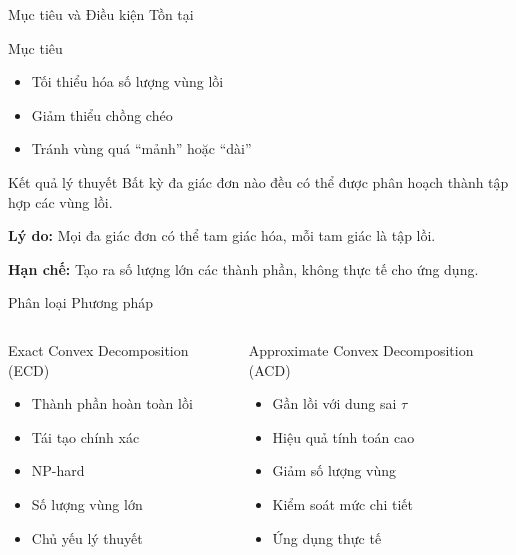 \documentclass[aspectratio=169]{beamer}
\begin{document}
\begin{frame}{Mục tiêu và Điều kiện Tồn tại}

    \begin{alertblock}{Mục tiêu}
        \begin{itemize}
            \item Tối thiểu hóa số lượng vùng lồi
            \item Giảm thiểu chồng chéo
            \item Tránh vùng quá ``mảnh'' hoặc ``dài''
        \end{itemize}
    \end{alertblock}

    \begin{exampleblock}{Kết quả lý thuyết}
        Bất kỳ đa giác đơn nào đều có thể được phân hoạch thành tập hợp các vùng lồi.

        \textbf{Lý do:} Mọi đa giác đơn có thể tam giác hóa, mỗi tam giác là tập lồi.

        \textbf{Hạn chế:} Tạo ra số lượng lớn các thành phần, không thực tế cho ứng dụng.
    \end{exampleblock}

\end{frame}

\begin{frame}{Phân loại Phương pháp}
    \begin{columns}[T]
        \begin{block}{Exact Convex Decomposition (ECD)}
            \begin{itemize}
                \item Thành phần hoàn toàn lồi
                \item Tái tạo chính xác
                \item NP-hard
                \item Số lượng vùng lớn
                \item Chủ yếu lý thuyết
            \end{itemize}
        \end{block}

        \begin{alertblock}{Approximate Convex Decomposition (ACD)}
            \begin{itemize}
                \item Gần lồi với dung sai $\tau$
                \item Hiệu quả tính toán cao
                \item Giảm số lượng vùng
                \item Kiểm soát mức chi tiết
                \item Ứng dụng thực tế
            \end{itemize}
        \end{alertblock}
    \end{columns}
\end{frame}
\end{document}
